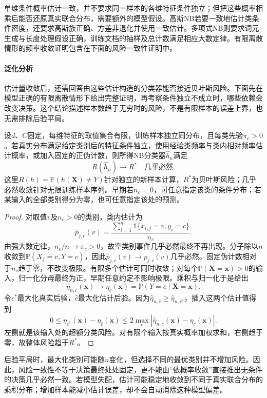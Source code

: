 单维条件概率估计一致，并不要求同一样本的各维特征条件独立；但把这些概率相乘后能否还原真实联合分布，需要额外的模型假设。高斯NB若要一致地估计类条件密度，还要求高斯族正确、方差非退化并使用一致估计。多项式NB则要求词元生成与长度处理假设正确，训练文档的抽样及总计数满足相应大数定律。有限离散情形的频率收敛证明包含在下面的风险一致性证明中。

\paragraph{泛化分析}
估计量收敛后，还需回答由这些估计构造的分类器能否接近贝叶斯风险。下面先在模型正确的有限离散情形下给出完整证明，再考察条件独立不成立时，哪些依赖会改变决策。这个结论描述样本数趋于无穷时的风险，不是有限样本的误差上界，也无需排除后验平局。
\begin{theorem}[有限离散特征下NB的风险一致性]
  \label{thm:classification-naive-bayes-consistency}
  设$d$、$C$固定，每维特征的取值集合有限，训练样本独立同分布，且每类先验$\pi_c>0$。若真实分布满足给定类别后的特征条件独立，使用经验类频率与类内相对频率估计概率，或加入固定的正伪计数，则所得NB分类器$\hat h_n$满足
  \[
    R(\hat h_n)\longrightarrow R^\ast
    \quad\text{几乎必然}.
  \]
  这里$R(h)=\mathbb{P}(h(\bm{X})\neq Y)$针对独立的新样本计算，$R^\ast$为贝叶斯风险；几乎必然收敛针对无限训练样本序列。早期若$n_c=0$，可任意指定该类的条件分布；若某输入的全部类别得分为零，也可任意指定该处的预测。
\end{theorem}
\begin{proof}
  对取值$v$及$n_c>0$的类别，类内估计为
  \[
    \hat p_{j,c}(v)
    =\frac{\sum_{i=1}^{n}\mathbb{1}\{x_{i,j}=v,y_i=c\}}
           {n_c}.
  \]
  由强大数定律，$n_c/n\to\pi_c>0$，故空类别事件几乎必然最终不再出现。分子除以$n$收敛到$\mathbb{P}(X_j=v,Y=c)$，因此$\hat p_{j,c}(v)\to p_{j,c}(v)$几乎必然。固定伪计数相对于$n_c$趋于零，不改变极限。有限多个估计可同时收敛；对每个$\mathbb{P}(\bm{X}=\bm{x})>0$的输入，归一化分母最终为正，早期任意约定不影响极限。乘积与归一化于是给出
  \[
    \hat\eta_{n,c}(\bm{x})
    \longrightarrow
    \eta_c(\bm{x})=\mathbb{P}(Y=c\mid\bm{X}=\bm{x}).
  \]
  令$c^\ast$最大化真实后验，$\hat c$最大化估计后验。因为$\hat\eta_{n,\hat c}\geq\hat\eta_{n,c^\ast}$，插入这两个估计值得到
  \[
    0\leq\eta_{c^\ast}(\bm{x})-\eta_{\hat c}(\bm{x})
    \leq2\max_c|\hat\eta_{n,c}(\bm{x})-\eta_c(\bm{x})|.
  \]
  左侧就是该输入处的超额分类风险。对有限个输入按真实概率加权求和，右侧趋于零，故整体风险趋于$R^\ast$。
\end{proof}

后验平局时，最大化类别可能随$n$变化，但选择不同的最优类别并不增加风险。因此，风险一致性不等于决策最终处处固定，更不能由“依概率收敛”直接推出无条件的决策几乎必然一致。若模型失配，估计可能稳定地收敛到不同于真实联合分布的乘积分布；增加样本能减小估计误差，却不会自动消除这种模型偏差。

